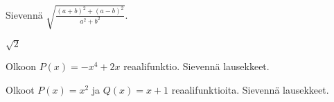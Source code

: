 \begin{tehtavasivu}
	\begin{tehtava}
Sievennä $\sqrt{\frac{(a+b)^2 + (a-b)^2}{a^2 + b^2}}$.
	\begin{vastaus}
$\sqrt{2}$
	\end{vastaus}
	\end{tehtava}

\begin{tehtava}
    Olkoon $P(x)=-x^4+2x$ reaalifunktio. Sievennä lausekkeet.
    \begin{alakohdat}
		\alakohta{$P(\sqrt{2})$}
    \end{alakohdat}
    \begin{vastaus}
        \begin{alakohdat}
        \end{alakohdat}
    \end{vastaus}
\end{tehtava}

\begin{tehtava}
    Olkoot $P(x)=x^2$ ja $Q(x)=x+1$ reaalifunktioita. Sievennä lausekkeet.
    \begin{alakohdat}
    \end{alakohdat}
    \begin{vastaus}
        \begin{alakohdat}
        \end{alakohdat}
    \end{vastaus}
\end{tehtava}

\end{tehtavasivu}